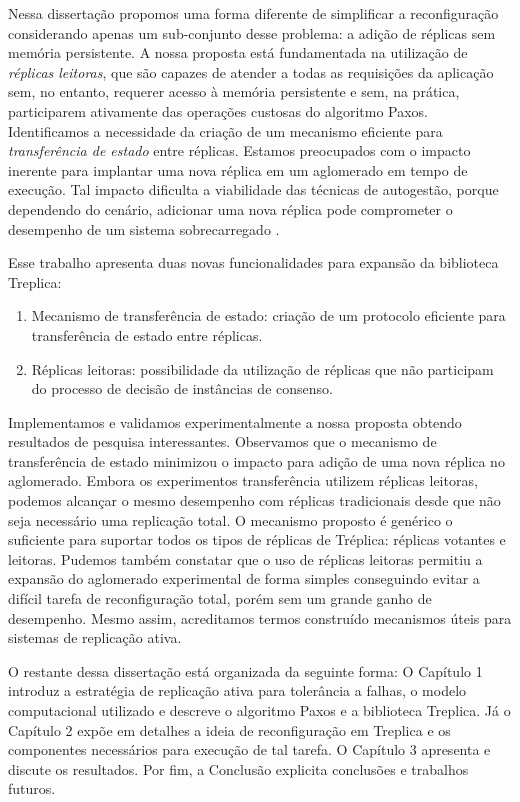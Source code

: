 Nessa dissertação propomos uma forma diferente de simplificar a reconfiguração
considerando apenas um sub-conjunto desse problema: a adição de réplicas sem memória
persistente. A nossa proposta está fundamentada na utilização de \emph{réplicas leitoras},
que são capazes de atender a todas as requisições da aplicação sem, no entanto, requerer
acesso à memória persistente e sem, na prática, participarem ativamente das operações
custosas do algoritmo Paxos. Identificamos a necessidade da criação de um mecanismo
eficiente para \emph{transferência de estado} entre réplicas. Estamos preocupados com o
impacto inerente para implantar uma nova réplica em um aglomerado em tempo de execução.
Tal impacto dificulta a viabilidade das técnicas de autogestão, porque dependendo do
cenário, adicionar uma nova réplica pode comprometer o desempenho de um sistema
sobrecarregado \cite{vilaca09}.

Esse trabalho apresenta duas novas funcionalidades para expansão da biblioteca Treplica:

\begin{enumerate}
  \item Mecanismo de transferência de estado: criação de um protocolo eficiente para
    transferência de estado entre réplicas.
  \item Réplicas leitoras: possibilidade da utilização de réplicas que não participam do
    processo de decisão de instâncias de consenso.
\end{enumerate}

Implementamos e validamos experimentalmente a nossa proposta obtendo resultados de
pesquisa interessantes. Observamos que o mecanismo de transferência de estado minimizou o
impacto para adição de uma nova réplica no aglomerado. Embora os experimentos
transferência utilizem réplicas leitoras, podemos alcançar o mesmo desempenho com réplicas
tradicionais desde que não seja necessário uma replicação total. O mecanismo proposto é
genérico o suficiente para suportar todos os tipos de réplicas de Tréplica: réplicas
votantes e leitoras. Pudemos também constatar que o uso de réplicas leitoras permitiu a
expansão do aglomerado experimental de forma simples conseguindo evitar a difícil tarefa
de reconfiguração total, porém sem um grande ganho de desempenho. Mesmo assim, acreditamos
termos construído mecanismos úteis para sistemas de replicação ativa.

O restante dessa dissertação está organizada da seguinte forma: O Capítulo 1 introduz a
estratégia de replicação ativa para tolerância a falhas, o modelo computacional utilizado
e descreve o algoritmo Paxos e a biblioteca Treplica. Já o Capítulo 2 expõe em detalhes a
ideia de reconfiguração em Treplica e os componentes necessários para execução de tal
tarefa. O Capítulo 3 apresenta e discute os resultados. Por fim, a Conclusão explicita
conclusões e trabalhos futuros.

